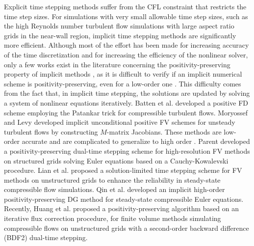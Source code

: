 Explicit time stepping methods suffer from the CFL constraint that restricts the time step sizes.
For simulations with very small allowable time step sizes, such as the high Reynolds number turbulent flow simulations with large aspect ratio grids in the near-wall region, implicit time stepping methods are significantly more efficient.
Although most of the effort has been made for increasing accuracy of the time discretization and for increasing the efficiency of the nonlinear solver, only a few works exist in the literature concerning the positivity-preserving property of implicit methods \cite{qin2018implicit}, as it is difficult to verify if an implicit numerical scheme is positivity-preserving, even for a low-order one \cite{huang2024general}. This difficulty comes from the fact that, in implicit time stepping, the solutions are updated by solving a system of nonlinear equations iteratively. Batten et al. \cite{batten1997average} developed a positive FD scheme employing the Patankar trick \cite{patankar2018numerical} for compressible turbulent flows. Moryossef and Levy \cite{moryossef2006unconditionally,mor2009unconditionally} developed implicit unconditional positive FV schemes for unsteady turbulent flows by constructing $M$-matrix Jacobians. These methods are low-order accurate and are complicated to generalize to high order \cite{qin2018implicit}. Parent \cite{parent2018positivity} developed a positivity-preserving dual-time stepping scheme for high-resolution FV methods on structured grids solving Euler equations based on a Cauchy-Kowalevski procedure. Lian et al. \cite{lian2009solution} proposed a solution-limited time stepping scheme for FV methods on unstructured grids to enhance the reliability in steady-state compressible flow simulations. Qin et al. \cite{qin2018implicit} developed an implicit high-order positivity-preserving DG method for steady-state compressible Euler equations. Recently, Huang et al. \cite{huang2024general} proposed a positivity-preserving algorithm based on an iterative flux correction procedure, for finite volume methods simulating compressible flows on unstructured grids with a second-order backward difference (BDF2) dual-time stepping.

